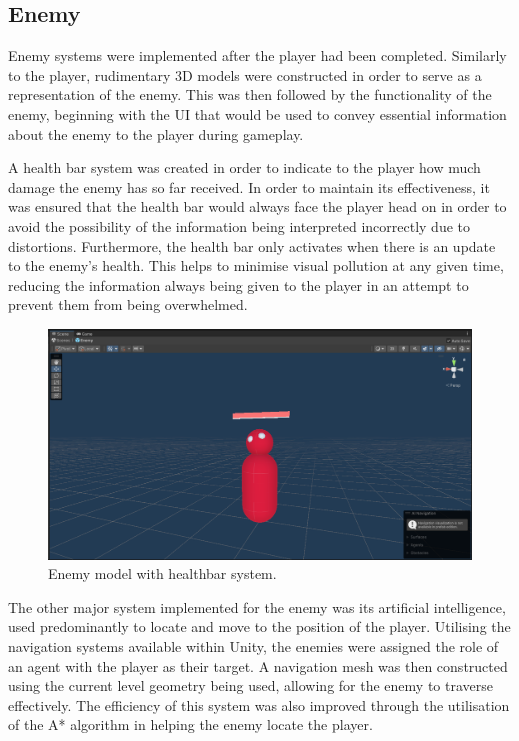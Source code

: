 \documentclass[11pt]{article}
\begin{document}
\subsection{Enemy}
Enemy systems were implemented after the player had been completed. Similarly to the player,
rudimentary 3D models were constructed in order to serve as a representation of the enemy. This was
then followed by the functionality of the enemy, beginning with the UI that would be used to convey
essential information about the enemy to the player during gameplay. 

A health bar system was created in order to indicate to the player how much damage the enemy has so
far received. In order to maintain its effectiveness, it was ensured that the health bar would
always face the player head on in order to avoid the possibility of the information being
interpreted incorrectly due to distortions. Furthermore, the health bar only activates when there
is an update to the enemy’s health. This helps to minimise visual pollution at any given time,
reducing the information always being given to the player in an attempt to prevent them from being
overwhelmed.

\begin{figure}[htb] 
    \centering
    \includegraphics[width=\columnwidth]{enemy}
    \caption{Enemy model with healthbar system.}
    \label{fig:enemy}
\end{figure}

The other major system implemented for the enemy was its artificial intelligence, used
predominantly to locate and move to the position of the player. Utilising the navigation systems
available within Unity, the enemies were assigned the role of an agent with the player as their
target. A navigation mesh was then constructed using the current level geometry being used,
allowing for the enemy to traverse effectively. The efficiency of this system was also improved
through the utilisation of the A* algorithm in helping the enemy locate the player. \\
\end{document}
